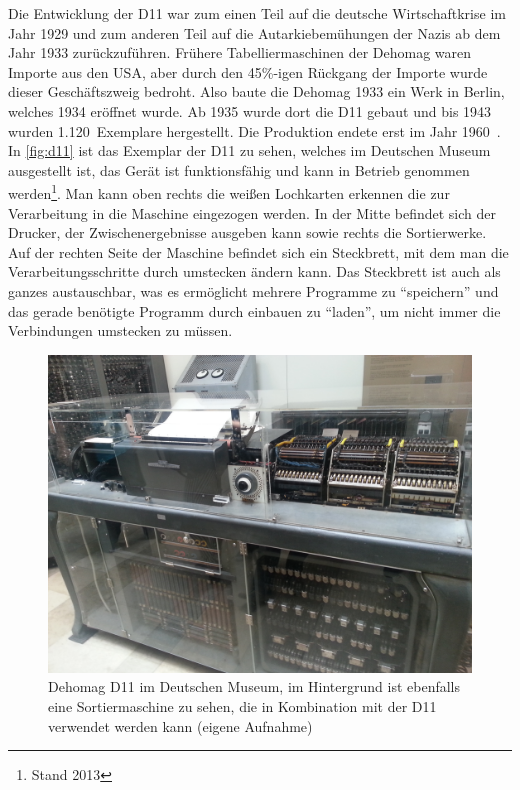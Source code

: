 \documentclass[parskip=half]{scrartcl}
\begin{document}
Die Entwicklung der D11 war zum einen Teil auf die deutsche Wirtschaftkrise im
Jahr 1929 und zum anderen Teil auf die Autarkiebemühungen der Nazis ab dem Jahr 1933
zurückzuführen. Frühere Tabelliermaschinen der Dehomag waren Importe aus den
USA, aber durch den 45\%-igen Rückgang der Importe wurde dieser Geschäftszweig
bedroht. Also baute die Dehomag 1933 ein Werk in Berlin, welches 1934 eröffnet
wurde. Ab 1935 wurde dort die D11 gebaut und bis 1943 wurden 1.120~Exemplare
hergestellt. Die Produktion endete erst im Jahr 1960~\cite{heide2009punched}.
In \autoref{fig:d11} ist das Exemplar der D11 zu sehen, welches im Deutschen
Museum ausgestellt ist, das Gerät ist funktionsfähig und kann in Betrieb
genommen werden\footnote{Stand 2013}. Man kann oben rechts die weißen
Lochkarten erkennen die zur Verarbeitung in die Maschine eingezogen werden. In
der Mitte befindet sich der Drucker, der Zwischenergebnisse ausgeben kann sowie
rechts die Sortierwerke. Auf der rechten Seite der Maschine befindet sich ein
Steckbrett, mit dem man die Verarbeitungsschritte durch umstecken ändern kann.
Das Steckbrett ist auch als ganzes austauschbar, was es ermöglicht mehrere
Programme zu \enquote{speichern} und das gerade benötigte Programm durch
einbauen zu \enquote{laden}, um nicht immer die Verbindungen umstecken zu
müssen.

\begin{figure}[h]
  \centering
  \includegraphics[width=\textwidth]{d11}
  \caption{Dehomag D11 im Deutschen Museum, im Hintergrund ist ebenfalls eine
    Sortiermaschine zu sehen, die in Kombination mit der D11 verwendet werden
    kann (eigene Aufnahme)}
  \label{fig:d11}
\end{figure}
\end{document}
